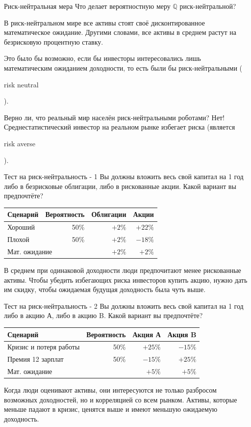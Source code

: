 \documentclass{beamer}
\newcommand{\en}[1]{\begin{otherlanguage}{english}#1\end{otherlanguage}}
\begin{document}
\begin{frame}{Риск-нейтральная мера}
\justify
Что делает вероятностную меру $\mathbb{Q}$ риск-нейтральной?

\justify
В риск-нейтральном мире все активы стоят своё дисконтированное математическое ожидание. Другими словами, все активы в среднем растут на безрисковую процентную ставку.

\justify
Это было бы возможно, если бы инвесторы интересовались лишь математическим ожиданием доходности, то есть были бы \alert{риск-нейтральными} (\en{risk neutral}).

\justify
Верно ли, что реальный мир населён риск-нейтральными роботами? Нет! Среднестатистический инвестор на реальном рынке \alert{избегает риска} (является \en{risk averse}).
\end{frame}



\begin{frame}{Тест на риск-нейтральность - 1}
\justify
Вы должны вложить весь свой капитал на 1 год либо в безрисковые облигации, либо в рискованные акции. Какой вариант вы предпочтёте?

\justify
\centering
\begin{tabular}{l|r|r|r}
Сценарий & Вероятность & Облигации & Акции \\ \hline
Хороший  & 50\%   & $+2\%$    & $+22\%$  \\
Плохой   & 50\%   & $+2\%$    & $-18\%$  \\ \hline
\multicolumn{2}{l|}{Мат. ожидание} & $+2\%$ & $+2\%$
\end{tabular}

\pause
\justify
В среднем при одинаковой доходности люди предпочитают менее рискованные активы. Чтобы убедить избегающих риска инвесторов купить акцию, нужно дать им скидку, чтобы ожидаемая будущая доходность была чуть выше.
\end{frame}



\begin{frame}{Тест на риск-нейтральность - 2}
\justify
Вы должны вложить весь свой капитал на 1 год либо в акцию А, либо в акцию B. Какой вариант вы предпочтёте?

\justify
\centering
\begin{tabular}{l|r|r|r}
Сценарий & Вероятность   & Акция А & Акция B \\ \hline
Кризис и потеря работы   & 50\%    & $+25\%$ & $-15\%$  \\
Премия 12 зарплат        & 50\%    & $-15\%$ & $+25\%$  \\ \hline
\multicolumn{2}{l|}{Мат. ожидание} & $+5\%$  & $+5\%$
\end{tabular}

\pause
\justify
Когда люди оценивают активы, они интересуются не только разбросом возможных доходностей, но и корреляцией со всем рынком. Активы, которые меньше падают в кризис, ценятся выше и имеют меньшую ожидаемую доходность.
\end{frame}
\end{document}

